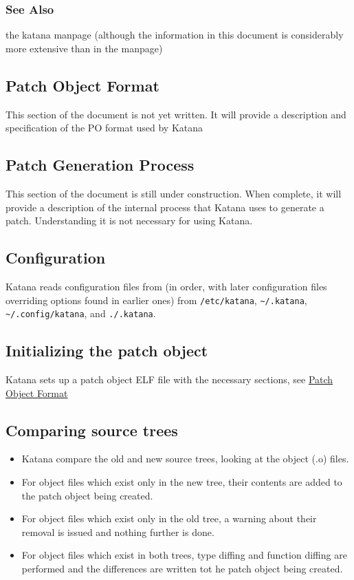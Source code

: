 \documentclass[11pt]{article}
\begin{document}
\subsubsection{See Also}
\label{sec-3.5.9}

    the katana manpage (although the information in this document is
    considerably more extensive than in the manpage)
\subsection{Patch Object Format}
\label{sec-3.6}

   This section of the document is not yet written. It will provide a description and specification of the PO format used by Katana
\subsection{Patch Generation Process}
\label{sec-3.7}

   This section of the document is still under construction. When
   complete, it will provide a description of the internal process that
   Katana uses to generate a patch. Understanding it is not necessary
   for using Katana.
   
\subsection{Configuration}
\label{sec-3.8}

   Katana reads configuration files from (in order, with later
   configuration files overriding options found in earlier ones) from
   \texttt{/etc/katana}, \texttt{\textasciitilde{}/.katana}, \texttt{\textasciitilde{}/.config/katana}, and \texttt{./.katana}.

\subsection{Initializing the patch object}
\label{sec-3.9}

   Katana sets up a patch object ELF file with the necessary sections,
   see \hyperref[sec-3.6]{Patch Object Format}
\subsection{Comparing source trees}
\label{sec-3.10}

\begin{itemize}
\item Katana compare the old and new source trees, looking at the object (.o)
     files.
\item For object files which exist only in the new tree, their contents
     are added to the patch object being created.
\item For object files which exist only in the old tree, a warning
     about their removal is issued and nothing further is done.
\item For object files which exist in both trees, type diffing and
     function diffing are performed and the differences are written
     tot he patch object being created.
\end{itemize}
\end{document}
